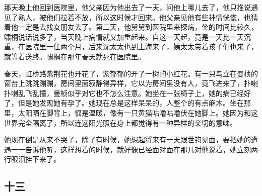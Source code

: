 \par 那天晚上他回到医院里，他父亲因为他出去了一天，问他上哪儿去了，他只推说遇见了熟人，被他们拉着不放，所以这时候才回来。他父亲见他有些神情恍惚，也猜着他一定是去找女朋友去了。第二天，他舅舅到医院里来探病，坐的时间比较久，啸桐说话说多了，当天晚上病情就又加重起来。自这一天起，竟是一天比一天沉重，在医院里一住两个月，后来沈太太也到上海来了，姨太太带着孩子们也来了，就等着送终。啸桐在那年春天就死在医院里。
\par 春天，虹桥路紫荆花也开花了，紫郁郁的开了一树的小红花。有一只鸟立在曼桢的窗台上跳跳蹦蹦，房间里面寂静得异样，它以为房间里没有人，竟飞进来了，扑喇扑喇乱飞乱撞，曼桢似乎对它也不怎么注意。她坐在一张椅子上，她的病已经好了，但是她发现她有孕了。她现在总是这样呆呆的，人整个的有点麻木。坐在那里，太阳晒在脚背上，很是温暖，像有一只黄猫咕噜咕噜伏在她脚上。她因为和这世界完全隔离了，所以连这阳光照在身上都觉得有一种异样的亲切的意味。
\par 她现在倒是从来不哭了，除了有时候，她想起将来有一天跟世钧见面，要把她的遭遇一一告诉他听，这样想着的时候，就好像已经面对面在那儿对他说着，她立刻两行眼泪挂下来了。


\subsection{十三}

